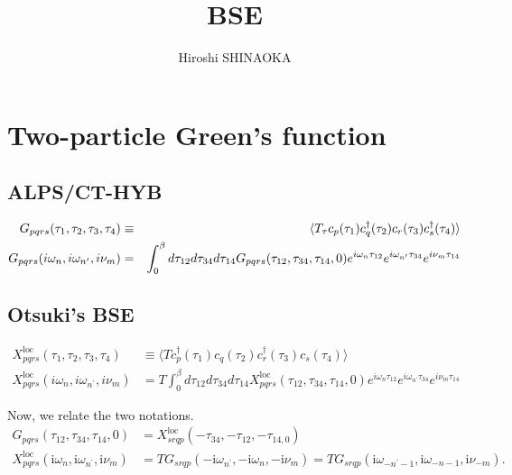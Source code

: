 \documentclass[disablejfam,12pt]{article}
\author{Hiroshi SHINAOKA}
\newcommand{\mi}{\ensuremath{\mathrm{i}}}
\begin{document}
\title{BSE}
\maketitle
\thispagestyle{empty}



\section{Two-particle Green's function}

\subsection{ALPS/CT-HYB}
\begin{eqnarray}
 G_{pqrs}(\tau_1, \tau_2, \tau_3, \tau_4) &\equiv& \braket{T_\tau c_p(\tau_1) c_q^\dagger(\tau_2) c_r(\tau_3) c_s^\dagger(\tau_4)}\\
 G_{pqrs}(i \omega_n, i \omega_{n^\prime}, i\nu_m) &=& \int_0^\beta  d \tau_{12} d \tau_{34} d \tau_{14} G_{pqrs}(\tau_{12}, \tau_{34}, \tau_{14}, 0) e^{i\omega_n \tau_{12}} e^{i\omega_{n^\prime} \tau_{34}}e^{i \nu_m \tau_{14}}
\end{eqnarray}

\subsection{Otsuki's BSE}

\begin{align}
X^\mathrm{loc}_{pqrs}(\tau_1, \tau_2, \tau_3, \tau_4) &\equiv \langle T c^\dagger_p(\tau_1) c_q(\tau_2) c^\dagger_r(\tau_3) c_s(\tau_4)\rangle\nonumber\\
X^\mathrm{loc}_{pqrs}(i \omega_n, i \omega_{n^\prime}, i\nu_m) &= T \int_0^\beta  d \tau_{12} d \tau_{34} d \tau_{14} X^\mathrm{loc}_{pqrs}(\tau_{12}, \tau_{34}, \tau_{14}, 0) e^{i\omega_n \tau_{12}} e^{i\omega_{n^\prime} \tau_{34}}e^{i \nu_m \tau_{14}}
\end{align}

Now, we relate the two notations.
\begin{align}
G_{pqrs}(\tau_{12}, \tau_{34}, \tau_{14}, 0) &= X^\mathrm{loc}_{srqp}(-\tau_{34}, -\tau_{12}, -\tau_{14, 0})\\
X^\mathrm{loc}_{pqrs}(\mi \omega_n, \mi \omega_{n^\prime}, \mi \nu_m) &= T G_{srqp}(-\mi \omega_{n^\prime}, -\mi \omega_n, -\mi \nu_m) = T G_{srqp}(\mi \omega_{-n^\prime-1}, \mi \omega_{-n-1}, \mi \nu_{-m}).
\end{align}
\end{document}
